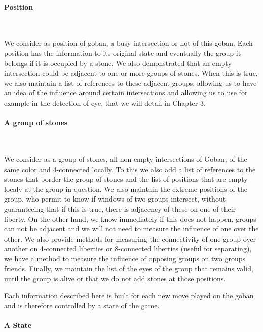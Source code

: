 \documentclass[a4paper,10pt,twoside]{report}
\begin{document}
	\paragraph{Position}
	~~\vspace{2mm}

	We consider as position of goban, a busy intersection or not of this goban. Each position has the information to its original state and eventually the group it belongs if it is occupied by a stone. We also demonstrated that an empty intersection could be adjacent to one or more groups of stones. When this is true, we also maintain a list of references to these adjacent groups, allowing us to have an idea of the influence around certain intersections and allowing us to use for example in the detection of eye, that we will detail in Chapter 3.

	
	\paragraph{A group of stones}
	~~\vspace{2mm}


	We consider as a group of stones, all non-empty intersections of Goban, of the same color and 4-connected locally. To this we also add a list of references to the stones that border the group of stones and the list of positions that are empty localy at the group in question. We also maintain the extreme positions of the group, who permit to know if windows of two groups intersect, without guaranteeing that if this is true, there is adjacency of these on one of their liberty. On the other hand, we know immediately if this does not happen, groups can not be adjacent and we will not need to measure the influence of one over the other. We also provide methods for measuring the connectivity of one group over another on 4-connected liberties or 8-connected liberties (useful for separating), we have a method to measure the influence of opposing groups on two groups friends. Finally, we maintain the list of the eyes of the group that remains valid, until the group is alive or that we do not add stones at those positions.

	Each information described here is built for each new move played on the goban and is therefore controlled by a state of the game.

	\paragraph{A State}
	~~\vspace{2mm}
\end{document}

